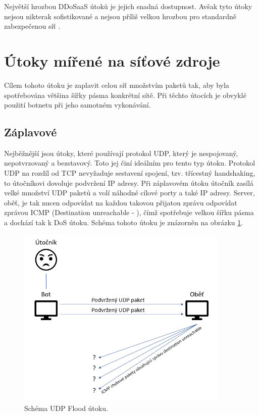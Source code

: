 Největší hrozbou DDoSaaS útoků je jejich snadná dostupnost. Avšak tyto útoky nejsou
nikterak sofistikované a nejsou příliš velkou hrozbou pro standardně zabezpečenou síť
\cite{DDoSaaS}.

\section{Útoky mířené na síťové zdroje}
\label{sec:utoky_na_sitove_zdroje}
Cílem tohoto útoku je zaplavit celou síť množstvím paketů tak, aby byla spotřebována většina
šířky pásma konkrétní sítě. Při těchto útocích je obvyklé použití botnetu při jeho samotném
vykonávání.

\subsection{Záplavové}
\label{subs_zaplavove}
Nejběžnější jsou útoky, které používají protokol UDP, který je nespojovaný, nepotvrzovaný a
bezstavový. Toto jej činí ideálním pro tento typ útoku. Protokol UDP na rozdíl od TCP
nevyžaduje sestavení spojení, tzv. třícestný handshaking, to útočníkovi dovoluje podvržení
IP adresy. Při záplavovém útoku útočník zasílá velké množství UDP paketů a volí náhodné
cílové porty a také IP adresy. Server, oběť, je tak nucen odpovídat na každou takovou
přijatou zprávu odpovídat zprávou ICMP (Destination unreachable - ),
čímž spotřebuje velkou šířku pásma a dochází tak k DoS útoku. Schéma tohoto útoku je znázorněn na obrázku \ref{fig:udp_flood_schema-img}.

\begin{figure} [ht]
	\centering
	\includegraphics[width=0.9\textwidth]{obrazky/udp_flood_schema.png} %
	\caption{Schéma UDP Flood útoku.}
	\label{fig:udp_flood_schema-img}
\end{figure}

